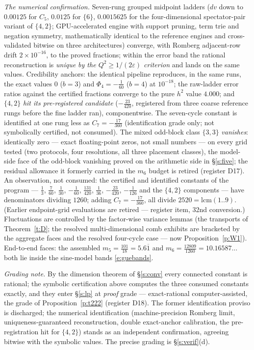 \documentclass[11pt]{article}
\numberwithin{equation}{section}
\theoremstyle{definition}
\theoremstyle{remark}
\begin{document}
\emph{The numerical confirmation.} Seven-rung grouped
midpoint ladders ($dv$ down to $0.00125$ for $C_5$, $0.0125$
for $\{6\}$, $0.0015625$ for the four-dimensional
spectator-pair variant of $\{4,2\}$; GPU-accelerated engine
with support pruning, term trie and negation symmetry,
mathematically identical to the reference engines and
cross-validated bitwise on three architectures) converge, with
Romberg adjacent-row drift $2\times10^{-16}$, to the proved
fractions; within the error band the rational reconstruction
is \emph{unique by the $Q^{2}\ge1/(2\varepsilon)$ criterion}
and lands on the same values. Credibility anchors: the
identical pipeline reproduces, in the same runs, the exact
values $0$ ($b=3$) and $\Phi_4=-\tfrac1{60}$ ($b=4$) at
$10^{-18}$; the raw-ladder error ratios against the certified
fractions converge to the pure $h^{2}$ value $4.000$; and
$\{4,2\}$ \emph{hit its pre-registered candidate}
($-\tfrac{23}{420}$, registered from three coarse reference
rungs before the fine ladder ran), componentwise. The
seven-cycle constant is identified at one rung less as
$C_7=-\tfrac{17}{360}$ (identification grade only; not
symbolically certified, not consumed). The mixed
odd-block class $\{3,3\}$ \emph{vanishes}: identically zero
--- exact floating-point zeros, not small numbers --- on every
grid tested (two protocols, four resolutions, all three
placement classes), the model-side face of the odd-block
vanishing proved on the arithmetic side in \S\ref{s:five};
the residual allowance it formerly carried in the $m_6$ budget
is retired (register D17). An
observation, not consumed: the certified and identified
constants of the program --- $\tfrac13$, $\tfrac7{60}$, $\tfrac1{30}$,
$-\tfrac1{60}$, $\tfrac{131}{420}$, $\tfrac1{36}$,
$-\tfrac{23}{420}$, $-\tfrac1{126}$ and the $\{4,2\}$
components --- have denominators dividing $1260$; adding
$C_7=-\tfrac{17}{360}$, all divide $2520=\mathrm{lcm}(1..9)$.
(Earlier endpoint-grid evaluations are retired --- register
item, 32nd conversion.)
Fluctuations are
controlled by the factor-wise variance lemmas (the transports of
Theorem~\ref{t:D}; the resolved multi-dimensional comb exhibits
are bracketed by the aggregate faces and the resolved four-cycle
case --- now Proposition~\ref{p:W1}). End-to-end faces: the
assembled
$m_5=\tfrac{101}{18}=5.6\overline{1}$ and
$m_6=\tfrac{12809}{1260}=10.16587\ldots$ both lie inside the
sine-model bands \eqref{e:guebands}.

\emph{Grading note.} By the dimension theorem of
\S\ref{s:conv} every connected constant is rational; the
symbolic certification above computes the three consumed
constants exactly, and they enter \S\ref{s:lp} at \emph{proof}
grade --- exact-rational computer-assisted, the grade of
Proposition~\ref{p:t222} (register D18). The former
identification proviso is discharged; the numerical
identification (machine-precision Romberg limit,
uniqueness-guaranteed reconstruction, double exact-anchor
calibration, the pre-registration hit for $\{4,2\}$) stands as
an independent confirmation, agreeing bitwise with the
symbolic values. The precise grading is \S\ref{s:verif}(d).
\end{document}
